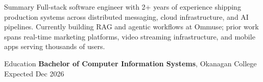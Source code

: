 \documentclass{resume}
\begin{document}
\vspace{-.5em}
\begin{rSection}{Summary}
{\scriptsize Full-stack software engineer with 2+ years of experience shipping production systems across distributed messaging, cloud infrastructure, and AI pipelines. Currently building RAG and agentic workflows at Ommuse; prior work spans real-time marketing platforms, video streaming infrastructure, and mobile apps serving thousands of users.}
\end{rSection}\vspace{-0.6em}

\begin{rSection}{Education}
{\scriptsize \textbf{Bachelor of Computer Information Systems}, Okanagan College \hfill Expected Dec 2026}
\end{rSection}\vspace{-0.5em}
\end{document}
